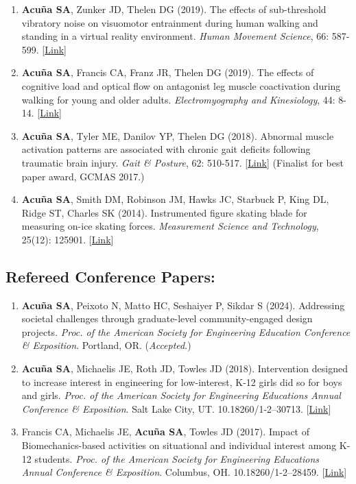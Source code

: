 \documentclass[letterpaper, 10pt]{article}
\begin{document}
\begin{enumerate}
    \item \textbf{Acuña SA}, Zunker JD, Thelen DG (2019). The effects of sub-threshold vibratory noise on visuomotor entrainment during human walking and standing in a virtual reality environment. \textit{Human Movement Science}, 66: 587-599. [\href{https://www.sciencedirect.com/science/article/abs/pii/S0167945719300582}{Link}]
    \item \textbf{Acuña SA}, Francis CA, Franz JR, Thelen DG (2019). The effects of cognitive load and optical ﬂow on antagonist leg muscle coactivation during walking for young and older adults. \textit{Electromyography and Kinesiology}, 44: 8-14. [\href{https://www.sciencedirect.com/science/article/abs/pii/S1050641118303122}{Link}]
    \item \textbf{Acuña SA}, Tyler ME, Danilov YP, Thelen DG (2018). Abnormal muscle activation patterns are associated with chronic gait deﬁcits following traumatic brain injury. \textit{Gait \& Posture}, 62: 510-517. [\href{https://www.sciencedirect.com/science/article/abs/pii/S096663621830359X}{Link}] (Finalist for best paper award, GCMAS 2017.)
    \item \textbf{Acuña SA}, Smith DM, Robinson JM, Hawks JC, Starbuck P, King DL, Ridge ST, Charles SK (2014). Instrumented ﬁgure skating blade for measuring on-ice skating forces. \textit{Measurement Science and Technology}, 25(12): 125901. [\href{https://iopscience.iop.org/article/10.1088/0957-0233/25/12/125901}{Link}]
\end{enumerate}

\subsection{Refereed Conference Papers:}
\begin{enumerate}
     \item \textbf{Acuña SA}, Peixoto N, Matto HC, Seshaiyer P, Sikdar S (2024). Addressing societal challenges through graduate-level community-engaged design projects. \textit{Proc. of the American Society for Engineering Education Conference \& Exposition}. Portland, OR. (\textit{Accepted}.) %
     \item \textbf{Acuña SA}, Michaelis JE, Roth JD, Towles JD (2018). Intervention designed to increase interest in engineering for low-interest, K-12 girls did so for boys and girls. \textit{Proc. of the American Society for Engineering Educations Annual Conference \& Exposition}. Salt Lake City, UT. 10.18260/1-2--30713. [\href{https://peer.asee.org/intervention-designed-to-increase-interest-in-engineering-for-low-interest-k-12-girls-did-so-for-boys-and-girls}{Link}] %
     \item Francis CA, Michaelis JE, \textbf{Acuña SA}, Towles JD (2017). Impact of Biomechanics-based activities on situational and individual interest among K-12 students. \textit{Proc. of the American Society for Engineering Educations Annual Conference \& Exposition}. Columbus, OH. 10.18260/1-2--28459. [\href{https://peer.asee.org/impact-of-biomechanics-based-activities-on-situational-and-individual-interest-among-k-12-students}{Link}] %
\end{enumerate}
\end{document}
